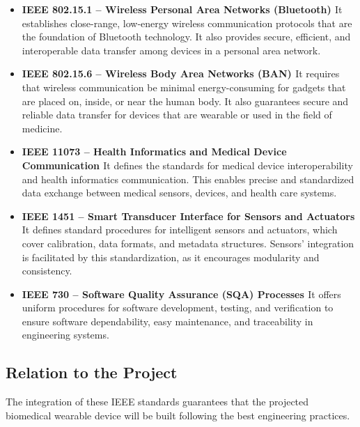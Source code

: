 \begin{itemize}
    \item \textbf{IEEE 802.15.1 – Wireless Personal Area Networks (Bluetooth) \cite{ieee802151}}  
    It establishes close-range, low-energy wireless communication protocols that are the foundation of Bluetooth technology. It also provides secure, efficient, and interoperable data transfer among devices in a personal area network.

    \item \textbf{IEEE 802.15.6 – Wireless Body Area Networks (BAN) \cite{ieee802156}}  
    It requires that wireless communication be minimal energy-consuming for gadgets that are placed on, inside, or near the human body. It also guarantees secure and reliable data transfer for devices that are wearable or used in the field of medicine.

    \item \textbf{IEEE 11073 – Health Informatics and Medical Device Communication \cite{ieee11073}}  
    It defines the standards for medical device interoperability and health informatics communication. This enables precise and standardized data exchange between medical sensors, devices, and health care systems.

    \item \textbf{IEEE 1451 – Smart Transducer Interface for Sensors and Actuators \cite{ieee1451}}  
    It defines standard procedures for intelligent sensors and actuators, which cover calibration, data formats, and metadata structures. Sensors' integration is facilitated by this standardization, as it encourages modularity and consistency.

    \item \textbf{IEEE 730 – Software Quality Assurance (SQA) Processes \cite{ieee730}}  
    It offers uniform procedures for software development, testing, and verification to ensure software dependability, easy maintenance, and traceability in engineering systems.
\end{itemize}

\subsection{Relation to the Project}

\noindent The integration of these IEEE standards guarantees that the projected biomedical wearable device will be built following the best engineering practices. \\

